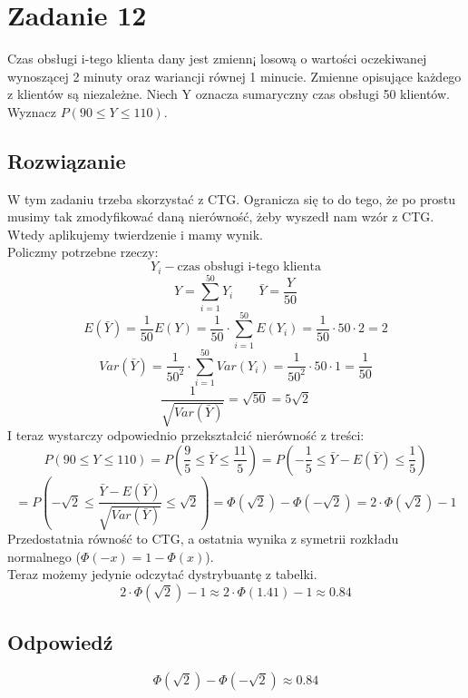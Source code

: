 \section{Zadanie 12}
Czas obsługi i-tego klienta dany jest zmienn¡ losową o wartości oczekiwanej wynoszącej 2 minuty oraz wariancji równej 1 minucie. Zmienne opisujące każdego z
klientów są niezależne. Niech Y oznacza sumaryczny czas obsługi 50 klientów. Wyznacz \(P(90 \le Y \le 110)\).
\subsection*{Rozwiązanie}
W tym zadaniu trzeba skorzystać z CTG. Ogranicza się to do tego, że po prostu musimy tak zmodyfikować
daną nierówność, żeby wyszedł nam wzór z CTG. Wtedy aplikujemy twierdzenie i mamy wynik.\\
Policzmy potrzebne rzeczy:\\
\[Y_i - \text{czas obsługi i-tego klienta}\]
\[Y=\sum_{i=1}^{50} Y_i \qquad \bar{Y} = \frac{Y}{50}\]
\[E(\bar{Y})=\frac{1}{50}E(Y)=\frac{1}{50} \cdot \sum_{i=1}^{50}E(Y_i)=\frac{1}{50} \cdot 50 \cdot 2=2\]
\[Var(\bar{Y})=\frac{1}{50^2}\cdot \sum_{i=1}^{50} Var(Y_i) =\frac{1}{50^2}\cdot 50 \cdot 1 = \frac{1}{50}\]
\[\frac{1}{\sqrt{Var(\bar Y)}}= \sqrt{50}=5\sqrt{2}\]
I teraz wystarczy odpowiednio przekształcić nierówność z treści:
\[P(90 \le Y \le 110) = P\left(\frac{9}{5}\le \bar{Y} \le \frac{11}{5}\right)= P\left(-\frac{1}{5}\le \bar{Y}-E(\bar{Y})\le \frac{1}{5} \right)\]
\[= P\left(-\sqrt{2} \le \frac{\bar{Y}-E(\bar{Y})}{\sqrt{Var(\bar Y )}}\le \sqrt{2} \right)=\Phi(\sqrt{2}) - \Phi(-\sqrt{2})=2\cdot\Phi(\sqrt{2})-1\]
Przedostatnia równość to CTG, a ostatnia wynika z symetrii rozkładu normalnego (\(\Phi(-x)=1-\Phi(x)\)).\\
Teraz możemy jedynie odczytać dystrybuantę z tabelki.
\[2\cdot\Phi(\sqrt{2})-1 \approx 2\cdot \Phi (1.41) - 1 \approx 0.84 \]

\subsection*{Odpowiedź}
\[
	\boxed{\Phi(\sqrt{2}) - \Phi(-\sqrt{2}) \approx 0.84 }
\]
